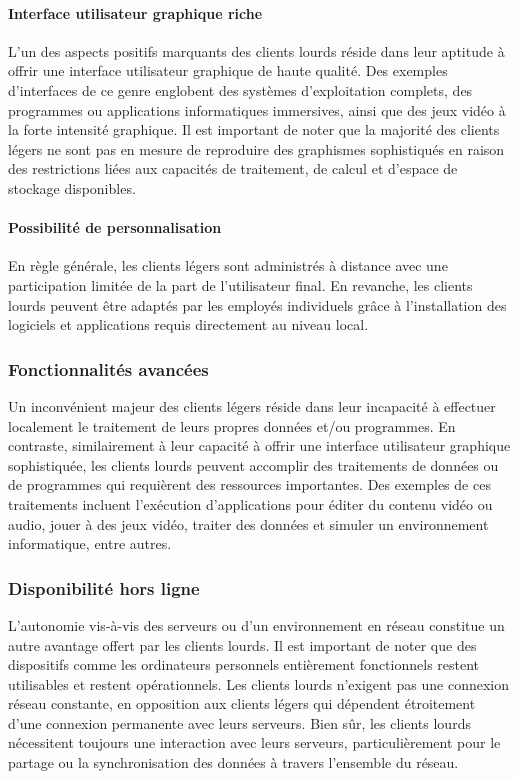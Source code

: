 \documentclass[a4paper, 12pt, french]{article}
\begin{document}
				\paragraph{Interface utilisateur graphique riche\\}
					L'un des aspects positifs marquants des clients lourds réside dans leur aptitude à offrir une interface utilisateur graphique de haute qualité. Des exemples d'interfaces de ce genre englobent des systèmes d'exploitation complets, des programmes ou applications informatiques immersives, ainsi que des jeux vidéo à la forte intensité graphique. Il est important de noter que la majorité des clients légers ne sont pas en mesure de reproduire des graphismes sophistiqués en raison des restrictions liées aux capacités de traitement, de calcul et d'espace de stockage disponibles.

				\paragraph{Possibilité de personnalisation\\}
					En règle générale, les clients légers sont administrés à distance avec une participation limitée de la part de l'utilisateur final. En revanche, les clients lourds peuvent être adaptés par les employés individuels grâce à l'installation des logiciels et applications requis directement au niveau local.
			
			\subsubsection{Fonctionnalités avancées}
				Un inconvénient majeur des clients légers réside dans leur incapacité à effectuer localement le traitement de leurs propres données et/ou programmes. En contraste, similairement à leur capacité à offrir une interface utilisateur graphique sophistiquée, les clients lourds peuvent accomplir des traitements de données ou de programmes qui requièrent des ressources importantes. Des exemples de ces traitements incluent l'exécution d'applications pour éditer du contenu vidéo ou audio, jouer à des jeux vidéo, traiter des données et simuler un environnement informatique, entre autres.

			\subsubsection{Disponibilité hors ligne}
				L'autonomie vis-à-vis des serveurs ou d'un environnement en réseau constitue un autre avantage offert par les clients lourds. Il est important de noter que des dispositifs comme les ordinateurs personnels entièrement fonctionnels restent utilisables et restent opérationnels. Les clients lourds n'exigent pas une connexion réseau constante, en opposition aux clients légers qui dépendent étroitement d'une connexion permanente avec leurs serveurs. Bien sûr, les clients lourds nécessitent toujours une interaction avec leurs serveurs, particulièrement pour le partage ou la synchronisation des données à travers l'ensemble du réseau.\\
\end{document}
